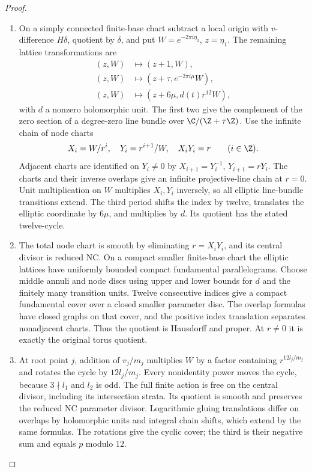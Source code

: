\begin{proof}
\begin{enumerate}[label=\arabic*.,leftmargin=*]
\item On a simply connected finite-base chart subtract a local origin with $v$-difference $H\delta$, quotient by $\delta$, and put $W=e^{-2\pi i\eta_2}$, $z=\eta_1$. The remaining lattice transformations are
\begin{align*}
 (z,W)&\mapsto(z+1,W),\\
 (z,W)&\mapsto(z+\tau,e^{-2\pi i\mu}W),\\
 (z,W)&\mapsto(z+6\mu,d(t)r^{12}W),
\end{align*}
with $d$ a nonzero holomorphic unit. The first two give the complement of the zero section of a degree-zero line bundle over $\C/(\Z+\tau\Z)$. Use the infinite chain of node charts
\begin{equation}\label{eq:P2chain}
 X_i=W/r^i,\quad Y_i=r^{i+1}/W,\quad X_iY_i=r\qquad(i\in\Z).
\end{equation}
Adjacent charts are identified on $Y_i\ne0$ by $X_{i+1}=Y_i^{-1}$, $Y_{i+1}=rY_i$. The charts and their inverse overlaps give an infinite projective-line chain at $r=0$. Unit multiplication on $W$ multiplies $X_i,Y_i$ inversely, so all elliptic line-bundle transitions extend. The third period shifts the index by twelve, translates the elliptic coordinate by $6\mu$, and multiplies by $d$. Its quotient has the stated twelve-cycle.

\item The total node chart is smooth by eliminating $r=X_iY_i$, and its central divisor is reduced NC. On a compact smaller finite-base chart the elliptic lattices have uniformly bounded compact fundamental parallelograms. Choose middle annuli and node discs using upper and lower bounds for $d$ and the finitely many transition units. Twelve consecutive indices give a compact fundamental cover over a closed smaller parameter disc. The overlap formulas have closed graphs on that cover, and the positive index translation separates nonadjacent charts. Thus the quotient is Hausdorff and proper. At $r\ne0$ it is exactly the original torus quotient.

\item At root point $j$, addition of $v_j/m_j$ multiplies $W$ by a factor containing $r^{12l_j/m_j}$ and rotates the cycle by $12l_j/m_j$. Every nonidentity power moves the cycle, because $3\nmid l_1$ and $l_2$ is odd. The full finite action is free on the central divisor, including its intersection strata. Its quotient is smooth and preserves the reduced NC parameter divisor. Logarithmic gluing translations differ on overlaps by holomorphic units and integral chain shifts, which extend by the same formulas. The rotations give the cyclic cover; the third is their negative sum and equals $p$ modulo $12$.


\end{enumerate}
\end{proof}
